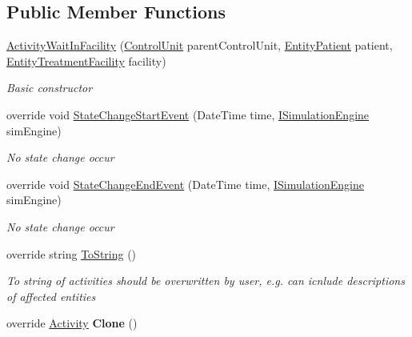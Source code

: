 \subsection*{Public Member Functions}
\begin{DoxyCompactItemize}
\item 
\hyperlink{class_general_health_care_elements_1_1_activities_1_1_activity_wait_in_facility_ad0e22ff2a072cd11224861f05a7d8eed}{Activity\+Wait\+In\+Facility} (\hyperlink{class_simulation_core_1_1_h_c_c_m_elements_1_1_control_unit}{Control\+Unit} parent\+Control\+Unit, \hyperlink{class_general_health_care_elements_1_1_entities_1_1_entity_patient}{Entity\+Patient} patient, \hyperlink{class_general_health_care_elements_1_1_entities_1_1_entity_treatment_facility}{Entity\+Treatment\+Facility} facility)
\begin{DoxyCompactList}\small\item\em Basic constructor \end{DoxyCompactList}\item 
override void \hyperlink{class_general_health_care_elements_1_1_activities_1_1_activity_wait_in_facility_a5bfeb00e216b89446dd0063820cc49b9}{State\+Change\+Start\+Event} (Date\+Time time, \hyperlink{interface_simulation_core_1_1_simulation_classes_1_1_i_simulation_engine}{I\+Simulation\+Engine} sim\+Engine)
\begin{DoxyCompactList}\small\item\em No state change occur \end{DoxyCompactList}\item 
override void \hyperlink{class_general_health_care_elements_1_1_activities_1_1_activity_wait_in_facility_a625c86fe914791277e8e0cf164065d01}{State\+Change\+End\+Event} (Date\+Time time, \hyperlink{interface_simulation_core_1_1_simulation_classes_1_1_i_simulation_engine}{I\+Simulation\+Engine} sim\+Engine)
\begin{DoxyCompactList}\small\item\em No state change occur \end{DoxyCompactList}\item 
override string \hyperlink{class_general_health_care_elements_1_1_activities_1_1_activity_wait_in_facility_a3f5ef1620ad3c1ae3432a4f20c577ca8}{To\+String} ()
\begin{DoxyCompactList}\small\item\em To string of activities should be overwritten by user, e.\+g. can icnlude descriptions of affected entities \end{DoxyCompactList}\item 
override \hyperlink{class_simulation_core_1_1_h_c_c_m_elements_1_1_activity}{Activity} {\bfseries Clone} ()\hypertarget{class_general_health_care_elements_1_1_activities_1_1_activity_wait_in_facility_a360a0490f46fd5cc50c52e13b4feaa1c}{}\label{class_general_health_care_elements_1_1_activities_1_1_activity_wait_in_facility_a360a0490f46fd5cc50c52e13b4feaa1c}

\end{DoxyCompactItemize}
